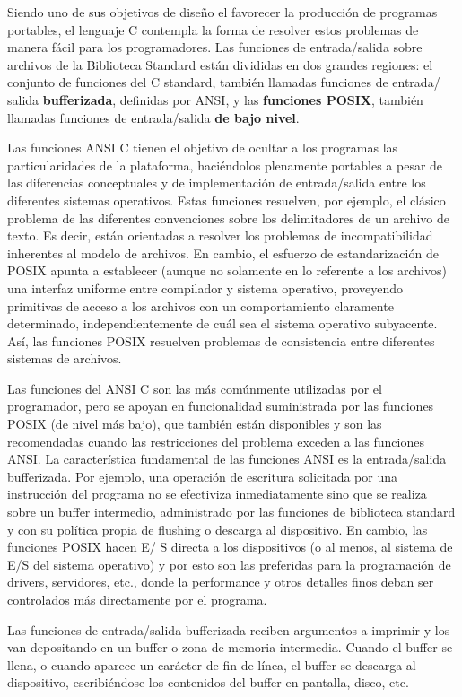 Siendo uno de sus objetivos de diseño el favorecer la producción de
programas portables, el lenguaje C contempla la forma de resolver estos problemas de
manera fácil para los programadores. Las funciones de entrada/salida sobre
archivos de la Biblioteca Standard están divididas en dos grandes regiones: el
conjunto de funciones del C standard, también llamadas funciones de entrada/
salida \textbf{bufferizada}, definidas por ANSI, y las \textbf{funciones POSIX}, también llamadas
funciones de entrada/salida \textbf{de bajo nivel}.

Las funciones ANSI C tienen el objetivo de ocultar a los programas las
particularidades de la plataforma, haciéndolos plenamente portables a pesar de
las diferencias conceptuales y de implementación de entrada/salida entre los
diferentes sistemas operativos. Estas funciones resuelven, por ejemplo, el
clásico problema de las diferentes convenciones sobre los delimitadores de un
archivo de texto. Es decir, están orientadas a resolver los problemas de
incompatibilidad inherentes al modelo de archivos. En cambio, el esfuerzo de
estandarización de POSIX apunta a establecer (aunque no solamente en lo
referente a los archivos) una interfaz uniforme entre compilador y sistema
operativo, proveyendo primitivas de acceso a los archivos con un comportamiento
claramente determinado, independientemente de cuál sea el sistema operativo
subyacente. Así, las funciones POSIX resuelven problemas de consistencia entre
diferentes sistemas de archivos.

Las funciones del ANSI C son las más comúnmente utilizadas por el programador,
pero se apoyan en funcionalidad suministrada por las funciones POSIX (de nivel
más bajo), que también están disponibles y son las recomendadas cuando las
restricciones del problema exceden a las funciones ANSI. La característica
fundamental de las funciones ANSI es la entrada/salida bufferizada. Por
ejemplo, una operación de escritura solicitada por una instrucción del programa
no se efectiviza inmediatamente sino que se realiza sobre un buffer intermedio,
administrado por las funciones de biblioteca standard y con su política propia
de flushing o descarga al dispositivo. En cambio, las funciones POSIX hacen E/
S directa a los dispositivos (o al menos, al sistema de E/S del sistema
operativo) y por esto son las preferidas para la programación de drivers,
servidores, etc., donde la performance y otros detalles finos deban ser
controlados más directamente por el programa.

Las funciones de entrada/salida bufferizada reciben argumentos a imprimir y
los van depositando en un buffer o zona de memoria intermedia.
Cuando el buffer se llena, o cuando aparece un carácter de fin de línea, el
buffer se descarga al dispositivo, escribiéndose los contenidos del buffer en
pantalla, disco, etc.

